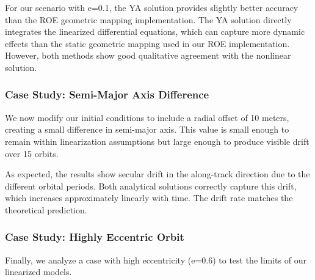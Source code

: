 For our scenario with e=0.1, the YA solution provides slightly better accuracy than the ROE geometric mapping implementation. The YA solution directly integrates the linearized differential equations, which can capture more dynamic effects than the static geometric mapping used in our ROE implementation. However, both methods show good qualitative agreement with the nonlinear solution.

\subsubsection{Case Study: Semi-Major Axis Difference}
We now modify our initial conditions to include a radial offset of 10 meters, creating a small difference in semi-major axis. This value is small enough to remain within linearization assumptions but large enough to produce visible drift over 15 orbits.



As expected, the results show secular drift in the along-track direction due to the different orbital periods. Both analytical solutions correctly capture this drift, which increases approximately linearly with time. The drift rate matches the theoretical prediction.

\subsubsection{Case Study: Highly Eccentric Orbit}
Finally, we analyze a case with high eccentricity (e=0.6) to test the limits of our linearized models.



